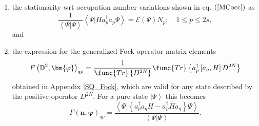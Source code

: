 \documentclass{preprint}
\begin{document}
\begin{enumerate}
\item the stationarity wrt occupation number variations shown in eq. $\left( %
\ref{MCocc}\right) $ as
\begin{equation}
\frac{1}{\left\langle \left. \Psi\right\vert \Psi\right\rangle }\left\langle
\left. \Psi\right\vert Ha_{p}^{\dagger}a_{p}\Psi\right\rangle =\mathcal{E}%
\left( \Psi\right) N_{p};\quad1\leq p\leq2s,
\end{equation}
and

\item the expression for the generalized Fock operator matrix elements \cite%
{YellowBook}
\begin{equation}
F\left( \mathbb{D}^{2},\bm{\varphi}\right) _{qp}=\frac{1}{\func{Tr}\left\{
D^{2N}\right\} }\func{Tr}\left\{ a_{p}^{\dagger}\left[ a_{q},H\right]
D^{2N}\right\}
\end{equation}
obtained in Appendix \ref{SQ_Fock}, which are valid for any state described
by the positive operator $D^{2N}$. For a pure state $\left\vert
\Psi\right\rangle $ this becomes
\begin{equation}
F\left( \bm{n},\bm{\varphi}\right) _{qp}=\frac{\left\langle \left.
\Psi\right\vert \left\{ a_{p}^{\dagger}a_{q}H-a_{p}^{\dagger}Ha_{q}\right\}
\Psi\right\rangle }{\left\langle \left. \Psi\right\vert \Psi\right\rangle }.
\end{equation}
\end{enumerate}
\end{document}
